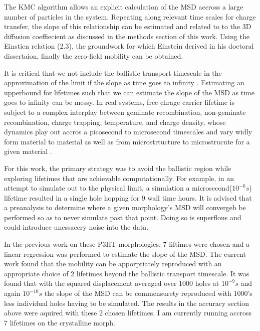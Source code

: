 The KMC algorithm allows an explicit calculation of the MSD accross a large number of 
particles in the system. Repeating along relevant time scales for 
charge transfer, the slope of this relationship
can be estimated and related to to the 3D diffusion coeffiecient as discussed in the methods section of this
work. Using the Einstien relation (2.3), 
the groundwork for which Einstein derived in his doctoral dissertaion, finally the zero-field
mobility can be obtained. 

It is critical that we not include the ballistic transport timescale in the approximation of the limit
if the slope as time goes to infinity \cite{Maginn2018}. Estimating an upperbound for lifetimes such that
we can estimate the slope of the MSD as time goes to infinity can be messy. In real systems, free chrage
carrier lifetime is subject to a complex interplay between geminate recombination, non-geminate recombination,
charge trapping, temperature, and charge density, whose dynamics play out accros a picosecond to microsecond
timescales and vary widly form material to material as well as from microstrtucture to microstrucute for a
given material \cite{Laquai2015}.

For this work, the primary strategy was to avoid the ballistic region while exploring lifetimes
that are achievable computationally. For example, in an attempt to simulate out to the physical limit, a
simulation a microsecond($10^{-6}s$) lifetime resulted in a single hole hopping for 9 wall time hours.
It is advised that a preanalysis to determine where a given morphology's MSD will convergeb be performed so as
to never simulate past that point. Doing so is superflous and could introduce unessacery noise into the data. 

In the previous work on these P3HT morphologies, 7 liftimes were chosen and a linear regression was performed
to estimate the slope of the MSD. The current work found that the mobility can be apporpriately reproduced
with an appropriate choice of 2 lifetimes beyond the ballistic transport timescale. It was found that with the 
squared displacement averaged over 1000 holes at $10^{-9}s$ and again $10^{-10}s$ the slope of the MSD can be
commensurety reproduced with 1000's less individual holes having to be simulated. The results in the accuracy
section above were aquired with these 2 chosen lifetimes. I am currently running accross 7 lifetimes on the
crystalline morph. 

